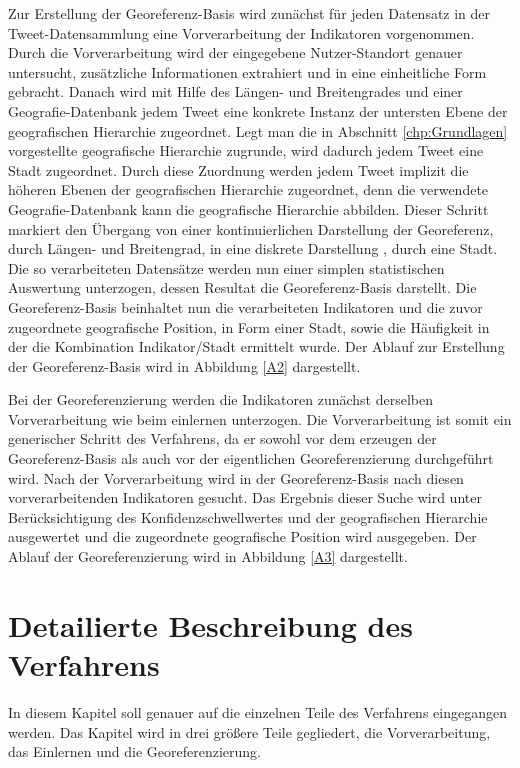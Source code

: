 	Zur Erstellung der Georeferenz-Basis wird zunächst für jeden Datensatz in der Tweet-Datensammlung eine Vorverarbeitung der Indikatoren vorgenommen.
	Durch die Vorverarbeitung wird der eingegebene Nutzer-Standort genauer untersucht, zusätzliche Informationen extrahiert und in eine einheitliche Form gebracht.
	Danach wird mit Hilfe des Längen- und Breitengrades und einer Geografie-Datenbank jedem Tweet eine konkrete Instanz der untersten Ebene der geografischen Hierarchie zugeordnet.
	Legt man die in Abschnitt \ref{chp:Grundlagen} vorgestellte geografische Hierarchie zugrunde, wird dadurch jedem Tweet eine Stadt zugeordnet.
	Durch diese Zuordnung werden jedem Tweet implizit die höheren Ebenen der geografischen Hierarchie zugeordnet, denn die verwendete Geografie-Datenbank kann die geografische Hierarchie abbilden.   	 
	Dieser Schritt markiert den Übergang von einer kontinuierlichen Darstellung der Georeferenz, durch Längen- und Breitengrad, in eine diskrete Darstellung , durch eine Stadt. 
	Die so verarbeiteten Datensätze werden nun einer simplen statistischen Auswertung unterzogen, dessen Resultat die Georeferenz-Basis darstellt.
	Die Georeferenz-Basis beinhaltet nun die verarbeiteten Indikatoren und die zuvor zugeordnete geografische Position, in Form einer Stadt, sowie die Häufigkeit in der die Kombination Indikator/Stadt ermittelt wurde.
	Der Ablauf zur Erstellung der Georeferenz-Basis wird in Abbildung \ref{A2} dargestellt.

	Bei der Georeferenzierung werden die Indikatoren zunächst derselben Vorverarbeitung wie beim einlernen unterzogen.
	Die Vorverarbeitung ist somit ein generischer Schritt des Verfahrens, da er sowohl vor dem erzeugen der Georeferenz-Basis als auch vor der eigentlichen Georeferenzierung durchgeführt wird.
	Nach der Vorverarbeitung wird in der Georeferenz-Basis nach diesen vorverarbeitenden Indikatoren gesucht.
	Das Ergebnis dieser Suche wird unter Berücksichtigung des Konfidenzschwellwertes und der geografischen Hierarchie ausgewertet und die zugeordnete geografische Position wird ausgegeben.  
	Der Ablauf der Georeferenzierung wird in Abbildung \ref{A3} dargestellt. 

	

	\section{Detailierte Beschreibung des Verfahrens}
	In diesem Kapitel soll genauer auf die einzelnen Teile des Verfahrens eingegangen werden. 
	Das Kapitel wird in drei größere Teile gegliedert, die Vorverarbeitung, das Einlernen und die Georeferenzierung.

